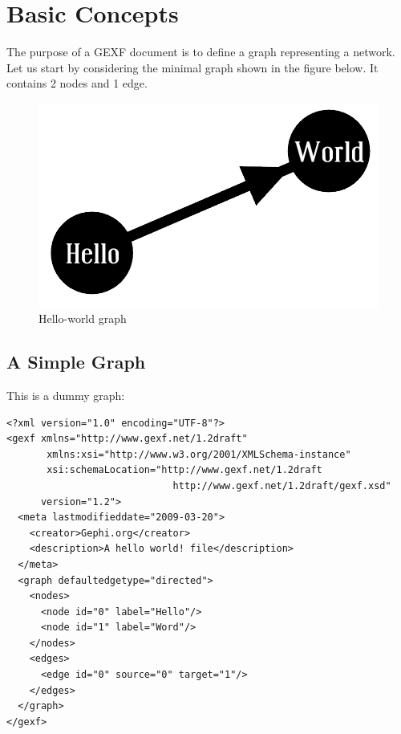 \documentclass[a4paper,10pt]{article}
\begin{document}
\section{Basic Concepts} \label{basic}

The purpose of a GEXF document is to define a graph representing a network. Let us start by considering the minimal graph shown in the figure below. It contains 2 nodes and 1 edge.

\begin{figure}[!ht]
  \begin{center}
  \includegraphics[scale=0.15]{res/simple.png}
  \caption{Hello-world graph}
  \end{center}
\end{figure}

\subsection{A Simple Graph}

This is a dummy graph:

\lstset{ style=gexf }
\begin{lstlisting}[caption={Hello world!},label=helloworld]
<?xml version="1.0" encoding="UTF-8"?>
<gexf xmlns="http://www.gexf.net/1.2draft"
       xmlns:xsi="http://www.w3.org/2001/XMLSchema-instance"
       xsi:schemaLocation="http://www.gexf.net/1.2draft
                             http://www.gexf.net/1.2draft/gexf.xsd"
      version="1.2">
  <meta lastmodifieddate="2009-03-20">
    <creator>Gephi.org</creator>
    <description>A hello world! file</description>
  </meta>
  <graph defaultedgetype="directed">
    <nodes>
      <node id="0" label="Hello"/>
      <node id="1" label="Word"/>
    </nodes>
    <edges>
      <edge id="0" source="0" target="1"/>
    </edges>
  </graph>
</gexf>
\end{lstlisting}
\end{document}
